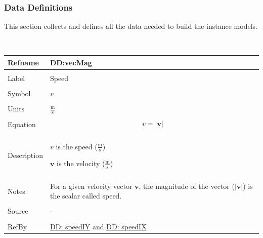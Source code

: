 \documentclass[12pt]{article}
\begin{document}
\subsubsection{Data Definitions}
\label{Sec:DDs}
This section collects and defines all the data needed to build the instance models.
\par~

\noindent \begin{minipage}{\textwidth}
\begin{tabular}{>{\raggedright}p{}>{\raggedright\arraybackslash}p{}}
\toprule \textbf{Refname} & \textbf{DD:vecMag}
\label{DD:vecMag}
\\ \midrule \\
Label & Speed
\\ \midrule \\
Symbol & $v$
\\ \midrule \\
Units & $\frac{\text{m}}{\text{s}}$
\\ \midrule \\
Equation & \begin{displaymath}
           v=|\mathbf{v}|
           \end{displaymath}
\\ \midrule \\
Description & \begin{symbDescription}
              \item{$v$ is the speed ($\frac{\text{m}}{\text{s}}$)}
              \item{$\mathbf{v}$ is the velocity ($\frac{\text{m}}{\text{s}}$)}
              \end{symbDescription}
\\ \midrule \\
Notes & For a given velocity vector $\mathbf{v}$, the magnitude of the vector ($|\mathbf{v}|$) is the scalar called speed.
\\ \midrule \\
Source & --
\\ \midrule \\
RefBy & \hyperref[DD:speedIY]{DD: speedIY} and \hyperref[DD:speedIX]{DD: speedIX}
\\ \bottomrule
\end{tabular}
\end{minipage}
\par~
\end{document}
